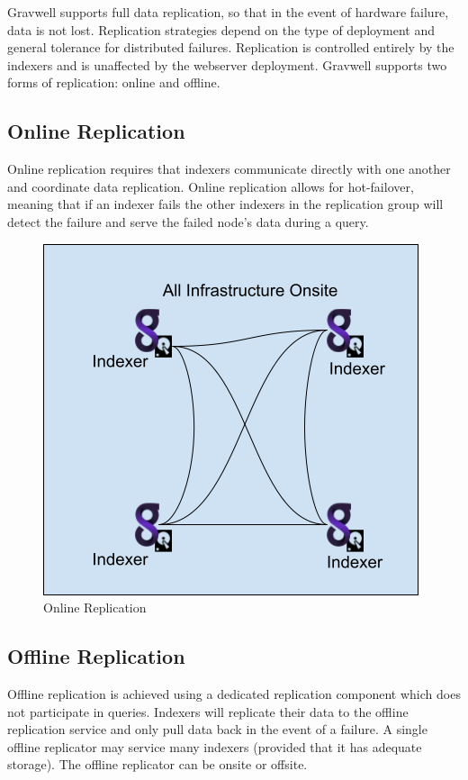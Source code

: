 {Gravwell supports full data replication, so that in the event of
hardware failure, data is not lost. Replication strategies depend on
the type of deployment and general tolerance for distributed failures.
Replication is controlled entirely by the indexers and is unaffected by
the webserver deployment. Gravwell supports two forms of replication:
online and offline.

\subsection{Online Replication}

Online replication requires that indexers communicate directly with one
another and coordinate data replication. Online replication allows for
hot-failover, meaning that if an indexer fails the other indexers in the
replication group will detect the failure and serve the failed node's
data during a query.

\begin{figure}[H]
	\includegraphics[width=0.6\linewidth]{images/onlinereplication.png}	
	\caption{Online Replication}
	\label{fig:onlinereplication}
\end{figure}


\subsection{Offline Replication}

Offline replication is achieved using a dedicated replication component
which does not participate in queries. Indexers will replicate their
data to the offline replication service and only pull data back in the
event of a failure. A single offline replicator may service many
indexers (provided that it has adequate storage). The offline
replicator can be onsite or offsite.

}
